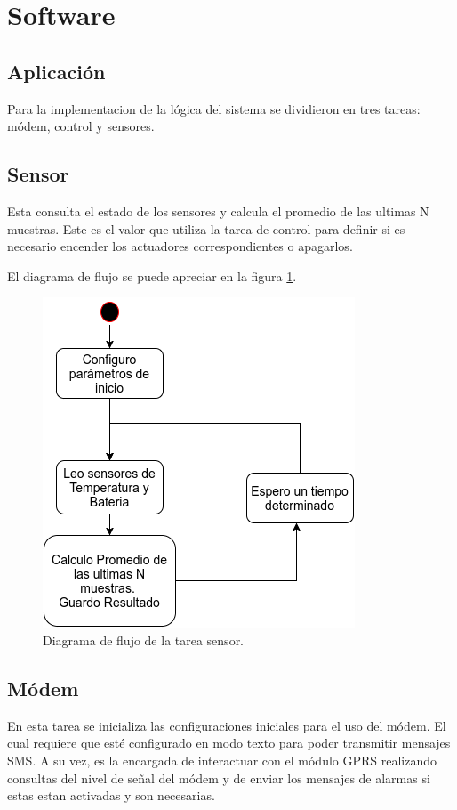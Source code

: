 \section{Software}
\subsection{Aplicación}
Para la implementacion de la lógica del sistema se dividieron en tres tareas: módem, control y sensores. 

\subsection*{Sensor}

Esta consulta el estado de los sensores y calcula el promedio de las ultimas N muestras. Este es el valor que utiliza la tarea de control para definir si es necesario encender los actuadores correspondientes o apagarlos.

El diagrama de flujo se puede apreciar en la figura \ref{fig:sensor_task}.

\begin{figure}[!htp]
  \centering
  \includegraphics[scale=.7]{./Figures/sensor_task.png}
  \caption{Diagrama de flujo de la tarea sensor.}
  \label{fig:sensor_task}
\end{figure}


\subsection*{Módem}
  En esta tarea se inicializa las configuraciones iniciales para el uso del módem. El cual requiere que esté configurado en modo texto para poder transmitir mensajes SMS. A su vez, es la encargada de interactuar con el módulo GPRS realizando consultas del nivel de señal del módem y de enviar los mensajes de alarmas si estas estan activadas y son necesarias.

